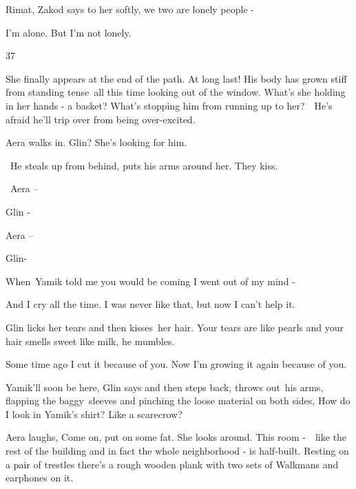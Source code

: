 \documentclass[letterpaper]{article}
\begin{document}
{\textquotedbl}Rimat,{\textquotedbl} Zakod says to her softly, {\textquotedbl}we two are lonely people -{\textquotedbl}

{\textquotedbl}I'm alone. But I'm not lonely.{\textquotedbl}


\bigskip

37 \ 

She finally appears at the end of the path. At long last! His body has grown stiff from standing
tense\textcolor[rgb]{0.0,0.6901961,0.9411765}{\ }all this time looking out of the window. What's she holding in her
hands - a basket? What's stopping him from running up to her?\ \ He's afraid he'll trip over from being over-excited.\ 

Aera walks in. {\textquotedbl}Glin?{\textquotedbl} She's looking for him.

~He steals up from behind, puts his arms around her. They kiss.

~{\textquotedbl}Aera --{\textquotedbl} 

{\textquotedbl}Glin -{\textquotedbl} 

{\textquotedbl}Aera --{\textquotedbl} 

{\textquotedbl}Glin{\textquotedbl}- 

{\textquotedbl}When\ Yamik told me you would be coming I went out of my mind {}-{\textquotedbl} 

{\textquotedbl}And I cry all the time. I was never like that, but now I can't help it.{\textquotedbl} 

Glin licks her tears and then kisses\ her hair. {\textquotedbl}Your tears are like pearls and your hair smells sweet
like milk,{\textquotedbl} he mumbles.\ 

{\textquotedbl}Some time ago I cut it because of you. Now I'm growing it again because of you.{\textquotedbl} 

{\textquotedbl}Yamik'll soon be here,{\textquotedbl} Glin says and then steps back, throws
out\textcolor[rgb]{0.0,0.4392157,0.7529412}{\ }his arms, flapping the baggy~sleeves and pinching the loose material on
both sides, {\textquotedbl}How do I look in Yamik's shirt? Like a scarecrow? {\textquotedbl} 

Aera laughs, {\textquotedbl}Come on, put on some fat.{\textquotedbl} She looks around. This room -\ \ like the rest of
the building and in fact the whole neighborhood - is half\textcolor[rgb]{0.0,0.4392157,0.7529412}{{}-}built. Resting on
a pair of trestles there's a rough wooden plank with two sets of Walkmans and earphones on it. 
\end{document}
